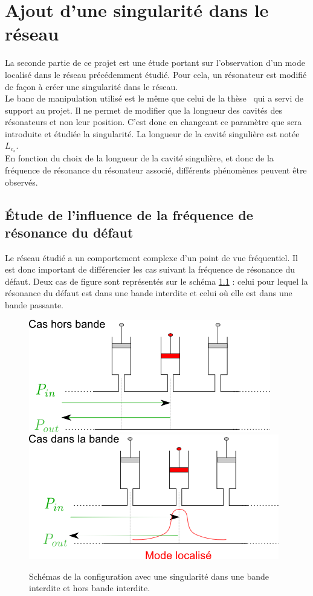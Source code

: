 \chapter{Ajout d'une singularité dans le réseau}
La seconde partie de ce projet est une étude portant sur l'observation d'un mode localisé dans le réseau précédemment étudié. Pour cela, un résonateur est modifié de façon à créer une singularité dans le réseau. \\


Le banc de manipulation utilisé est le même que celui de la thèse~\cite{these_richoux} qui a servi de support au projet. Il ne permet de modifier que la longueur des cavités des résonateurs et non leur position. C'est donc en changeant ce paramètre que sera introduite et étudiée la singularité. La longueur de la cavité singulière est notée $L_{c_{s}}$.\\

En fonction du choix de la longueur de la cavité singulière, et donc de la fréquence de résonance du résonateur associé, différents phénomènes peuvent être observés. 

\section{Étude de l'influence de la fréquence de résonance du défaut}
Le réseau étudié a un comportement complexe d'un point de vue fréquentiel. Il est donc important de différencier les cas suivant la fréquence de résonance du défaut. Deux cas de figure sont représentés sur le schéma \ref{schema_singu1} : celui pour lequel la résonance du défaut est dans une bande interdite et celui où elle est dans une bande passante.

\begin{figure}[!h]
\centering
\includegraphics[scale=0.5]{images_chp2/schema_singu1.png} \hfill
\includegraphics[scale=0.5]{images_chp2/schema_singu2.png}
\caption{\label{schema_singu1} Schémas de la configuration avec une singularité dans une bande interdite  et hors bande interdite.}
\end{figure}




